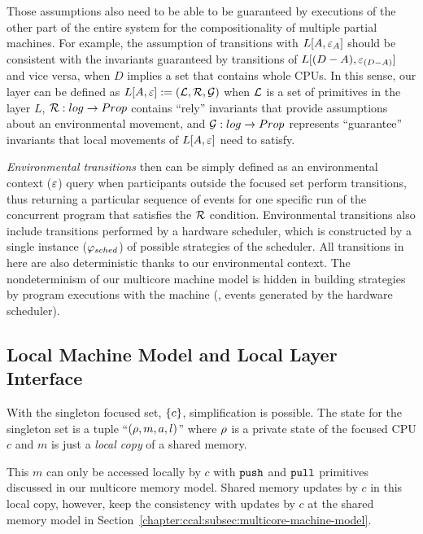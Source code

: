 Those assumptions  also need to be able to be guaranteed by executions of the other part of the entire system for 
the compositionality of multiple partial machines.
For example, the assumption of transitions with $L[A, {\varepsilon}_{A}]$ should be consistent with the invariants guaranteed by transitions of $L[(D - A), {\varepsilon}_{(D-A)}]$ and vice versa, when $D$ implies a set that contains whole CPUs.
In this sense, our layer can be defined as
$L[A, {\varepsilon}] := (\mathcal{L}, \mathcal{R},\mathcal{G})$ when $\mathcal{L}$ is a set of primitives in the layer $L$,
$\mathcal{R} : log \rightarrow Prop$ contains  ``rely'' invariants that provide assumptions about an environmental movement,
and $\mathcal{G}: log \rightarrow Prop$ represents ``guarantee'' invariants that local movements of $L[A, {\varepsilon}]$ need to satisfy.

\emph{Environmental transitions} then can be simply defined as 
an environmental context (${\varepsilon}$) query when participants outside  the focused set perform transitions,
thus returning a particular sequence of events for one specific run of the concurrent program 
that satisfies the $\mathcal{R}$ condition.
Environmental transitions also include  transitions performed by 
a hardware scheduler, which is constructed by 
a single instance ($\varphi_{sched}$) of possible strategies of the scheduler.
All transitions in here are also deterministic thanks to our environmental context.
The nondeterminism of our multicore machine model is hidden in building strategies by
program executions with the machine (\eg, events generated by the hardware scheduler).

\subsection{Local Machine Model and Local Layer Interface}
\label{chapter:ccal:subsec:local-layer-interface}

With the singleton focused set, $\{c\}$, 
simplification is possible.
The state for the singleton set is a tuple ``$(\rho, m, a, l)$''
where $\rho$ is a private state of the focused CPU $c$
and $m$ is just a \emph{local copy} of a shared memory.


This $m$ can only be accessed locally by $c$ with  ${\mathrm{\texttt{push}}}$ and ${\mathrm{\texttt{pull}}}$ primitives discussed in our multicore memory model. 
Shared  memory updates by $c$ in this local copy, however, 
keep the consistency with 
 updates by $c$ at the shared memory model in
Section~\ref{chapter:ccal:subsec:multicore-machine-model}.


